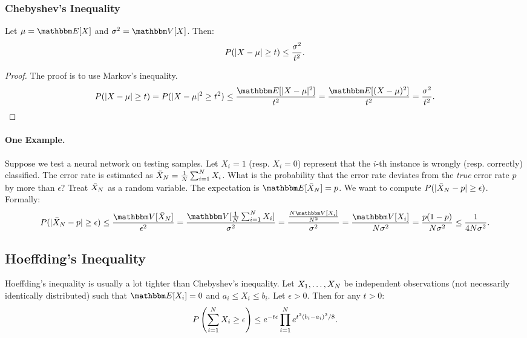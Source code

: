     \subsubsection{Chebyshev's Inequality}
    Let $\mu = \E[X]$ and $\sigma^2 = \Var[X]$.
    Then:
        \begin{equation}
            P(| X - \mu | \ge t) \le \frac{\sigma^2}{t^2}.
        \end{equation}
    \begin{proof}
        The proof is to use Markov's inequality.
        \begin{equation}
            P(\Abs{X - \mu} \ge t) = P(\Abs{X - \mu}^2 \ge t^2) \le \frac{\E[\Abs{X - \mu}^2]}{t^2} =  \frac{\E[(X - \mu)^2]}{t^2} = \frac{\sigma^2}{t^2}.
        \end{equation}
    \end{proof}
    
    \paragraph{One Example.}
    Suppose we test a neural network on \ndata testing samples.
    Let $X_i=1$ (resp. $X_i = 0$) represent that the $i$-th instance is wrongly (resp. correctly) classified.
    The error rate is estimated as $\bar{X}_N = \frac{1}{N} \sum_{i=1}^{N}{X_i}$.
    What is the probability that the error rate deviates from the \emph{true} error rate $p$ by more than $\epsilon$?
    Treat $\bar{X}_N$ as a random variable.
    The expectation is $\E[\bar{X}_\ndata] = p$.
    We want to compute $P(| \bar{X}_N - p | \ge \epsilon)$.
    Formally:
        \begin{equation}
            P(\Abs{\bar{X}_\ndata - p} \ge \epsilon) \le \frac{\Var[\bar{X}_\ndata]}{\epsilon^2} = \frac{\Var[\frac{1}{\ndata} \sum_{i=1}^{\ndata}{X_i}]}{\sigma^2} = \frac{\frac{\ndata \Var[X_i]}{\ndata^2}}{\sigma^2} = \frac{\Var[X_i]}{\ndata \sigma^2} = \frac{p (1 - p)}{N \sigma^2} \le \frac{1}{4\ndata \sigma^2}.
        \end{equation}
    
    
    \subsection{Hoeffding's Inequality}
        Hoeffding's inequality is usually a lot tighter than Chebyshev's inequality.
        Let $X_1, \ldots, X_N$ be independent observations (not necessarily identically distributed) such that $\E[X_i] = 0$ and $a_i \le X_i \le b_i$.
        Let $\epsilon > 0$.
        Then for any $t > 0$:
            \begin{equation}
                P\left( \sum_{i=1}^{N}{X_i} \ge \epsilon \right) \le e^{-t\epsilon} \prod_{i=1}^{N}{e^{t^2(b_i-a_i)^2/8} }.
            \end{equation}


